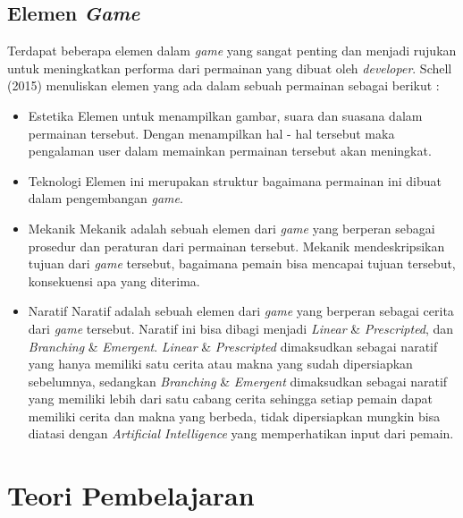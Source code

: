 	\subsection{Elemen \textit{Game}}
	Terdapat beberapa elemen dalam \textit{game} yang sangat penting dan menjadi rujukan untuk meningkatkan performa dari permainan yang dibuat oleh \textit{developer}. Schell (2015) menuliskan elemen yang ada dalam sebuah permainan sebagai berikut :
	\begin{itemize}
		\item Estetika
			\subitem Elemen untuk menampilkan gambar, suara dan suasana dalam permainan tersebut. Dengan menampilkan hal - hal tersebut maka pengalaman user dalam memainkan permainan tersebut akan meningkat.
		\item Teknologi
			\subitem Elemen ini merupakan struktur bagaimana permainan ini dibuat dalam pengembangan \textit{game}.
		\item Mekanik
			\subitem Mekanik adalah sebuah elemen dari \textit{game} yang berperan sebagai prosedur dan peraturan dari permainan tersebut. Mekanik mendeskripsikan tujuan dari \textit{game} tersebut, bagaimana pemain bisa mencapai tujuan tersebut, konsekuensi apa yang diterima.
		\item Naratif
			\subitem Naratif adalah sebuah elemen dari \textit{game} yang berperan sebagai cerita dari \textit{game} tersebut. Naratif ini bisa dibagi menjadi \textit{Linear} \& \textit{Prescripted}, dan \textit{Branching} \& \textit{Emergent}. \textit{Linear} \& \textit{Prescripted} dimaksudkan sebagai naratif yang hanya memiliki satu cerita atau makna yang sudah dipersiapkan sebelumnya, sedangkan \textit{Branching} \& \textit{Emergent} dimaksudkan sebagai naratif yang memiliki lebih dari satu cabang cerita sehingga setiap pemain dapat memiliki cerita dan makna yang berbeda, tidak dipersiapkan mungkin bisa diatasi dengan \textit{Artificial Intelligence} yang memperhatikan input dari pemain.
	\end{itemize}
	
\section{Teori Pembelajaran}
